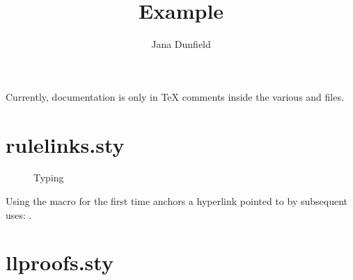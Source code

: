 \documentclass{purple}
\title{Example}
\author{Jana Dunfield}
\newcommand{\macroname}[1]{\texttt{\Backslash}\textvtt{#1}}
\begin{document}
\maketitle

Currently, documentation is only in TeX comments inside the various  and  files.

\section{rulelinks.sty}

\begin{figure}[htbp]
  \centering

  \begin{mathpar}
  \end{mathpar}
  
  \caption{Typing}
  \label{fig:typing}
\end{figure}

Using the macro \macroname{EVar} for the first time anchors a hyperlink pointed to
by subsequent uses: \EVar.



\clearpage

\section{llproofs.sty}

\newcommand{\ctxoutsym}{{\dashv}}
\newcommand{\ctxout}[1]{\mathrel{\ctxoutsym}{#1}}

\newcommand{\judgetp}[2]{{#1} \entails {#2}}
\newcommand{\judgetpPf}[3]{\Pf{#1}{\entails}{#2}{#3}}

\newcommand{\declsynjudg}[3]{{#1} \entails {#2} \Rightarrow {#3}}
\newcommand{\declsynjudgPf}[4]{\ePf{#1}{{#2} \Rightarrow {#3}}{#4}}
\newcommand{\synjudg}[4]{{#1} \entails {#2} \Rightarrow {#3} \ctxout{#4}}
\newcommand{\synjudgPf}[5]{\ePf{#1}{{#2} \Rightarrow {#3} \ctxout{#4}}{#5}}

\newcommand{\substextendsym}{\longrightarrow}
\newcommand{\substextend}[2]{{#1} \substextendsym {#2}}
\newcommand{\substextendPf}[3]{\Pf{#1}{\substextendsym}{#2}{#3}}
\end{document}
